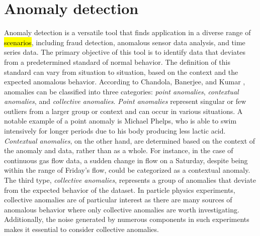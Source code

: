 \section{Anomaly detection}
Anomaly detection is a versatile tool that finds application in a diverse range of \hl{scenarios}, 
including fraud detection, anomalous sensor data analysis, and time series data. The primary 
objective of this tool is to identify data that deviates from a predetermined standard of 
normal behavior. The definition of this standard can vary from situation to situation, based 
on the context and the expected anomalous behavior. According to Chandola, Banerjee, and 
Kumar \cite{anom_detec}, anomalies can be classified into three categories: \textit{point anomalies}, 
\textit{contextual anomalies}, and \textit{collective anomalies}. \textit{Point anomalies} represent singular or few 
outliers from a larger group or context and can occur in various situations. A notable example 
of a point anomaly is Michael Phelps, who is able to swim intensively for longer periods due 
to his body producing less lactic acid. \textit{Contextual anomalies}, on the other hand, are determined 
based on the context of the anomaly and data, rather than as a whole. For instance, in the 
case of continuous gas flow data, a sudden change in flow on a Saturday, despite being within 
the range of Friday's flow, could be categorized as a contextual anomaly. The third type, 
\textit{collective anomalies}, represents a group of anomalies that deviate from the expected behavior 
of the dataset. In particle physics experiments, collective anomalies are of particular 
interest as there are many sources of anomalous behavior where only collective anomalies are 
worth investigating. Additionally, the noise generated by numerous components in such 
experiments makes it essential to consider collective anomalies.
